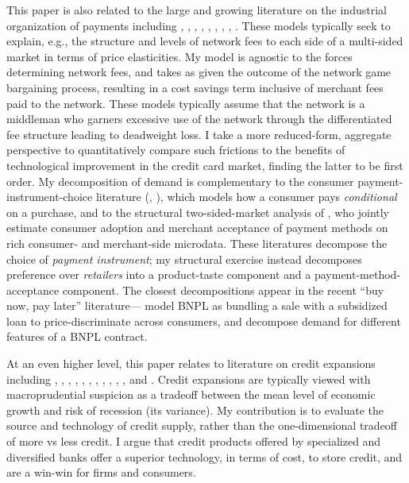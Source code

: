 \documentclass[12pt,english]{article}
\begin{document}
This paper is also related to the large and growing literature on the industrial organization of payments including \cite{rochet_platform_2003}, \cite{edelman_price_2015}, \cite{wang_regulating_2023}, \cite{brunnermeier_mobile_2023}, \cite{agarwal_real_2020}, \cite{huynh_equilibrium_2022}, \cite{arango_consumer_2015}, \cite{huynh_role_2014}, \cite{evans_paying_2004}. These models typically seek to explain, e.g., the structure and levels of network fees to each side of a multi-sided market in terms of price elasticities. My model is agnostic to the forces determining network fees, and takes as given the outcome of the network game bargaining process, resulting in a cost savings term inclusive of merchant fees paid to the network. These models typically assume that the network is a middleman who garners excessive use of the network through the differentiated fee structure leading to deadweight loss. I take a more reduced-form, aggregate perspective to quantitatively compare such frictions to the benefits of technological improvement in the credit card market, finding the latter to be first order. My decomposition of demand is complementary to the consumer payment-instrument-choice literature (\cite{koulayev_explaining_2016}, \cite{arango_consumer_2015}), which models how a consumer pays \emph{conditional} on a purchase, and to the structural two-sided-market analysis of \cite{huynh_equilibrium_2022}, who jointly estimate consumer adoption and merchant acceptance of payment methods on rich consumer- and merchant-side microdata. These literatures decompose the choice of \emph{payment instrument}; my structural exercise instead decomposes preference over \emph{retailers} into a product-taste component and a payment-method-acceptance component. The closest decompositions appear in the recent ``buy now, pay later'' literature---\cite{berg_economics_2025} model BNPL as bundling a sale with a subsidized loan to price-discriminate across consumers, and \cite{aidala_understanding_2025} decompose demand for different features of a BNPL contract.

At an even higher level, this paper relates to literature on credit expansions including \cite{beck_finance_2008}, \cite{beck_big_2010},  \cite{kroszner_regulation_2014}, \cite{jayaratne_entry_1998}, \cite{kroszner_what_1999}, \cite{chong_effects_1991}, \cite{schularick_credit_2012}, \cite{mian_what_2014}, \cite{mian_how_2020}, \cite{julia_fonseca_how_nodate}, \cite{herkenhoff_impact_2021}, and \cite{muller_credit_2023}. Credit expansions are typically viewed with macroprudential suspicion as a tradeoff between the mean level of economic growth and risk of recession (its variance). My contribution is to evaluate the source and technology of credit supply, rather than the one-dimensional tradeoff of more vs less credit. I argue that credit products offered by specialized and diversified banks offer a superior technology, in terms of cost, to store credit, and are a win-win for firms and consumers. 
\end{document}
